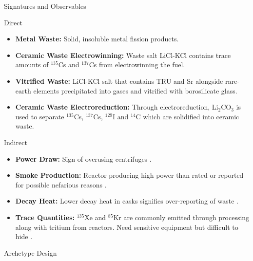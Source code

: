 \documentclass[final]{beamer}
\newlength{\onecolwid}
\newlength{\threecolwid}
\begin{document}
\begin{frame}[t]
\begin{columns}[t,totalwidth=\threecolwid]
\begin{column}{\onecolwid}
\begin{block}{Signatures and Observables}
\begin{block}{Direct}	
	\begin{itemize}
		\item \textbf{Metal Waste:} Solid, insoluble metal fission products.
		\item \textbf{Ceramic Waste Electrowinning:} Waste salt LiCl-KCl contains trace amounts of $^{135}$Cs and $^{137}$Cs from
		electrowinning the fuel.
		\item \textbf{Vitrified Waste:} LiCl-KCl salt that contains TRU and Sr alongside rare-earth elements precipitated into gases
		and vitrified with borosilicate glass.
		\item \textbf{Ceramic Waste Electroreduction:} Through electroreduction, Li$_2$CO$_3$ is used to separate $^{135}$Cs, $^{137}$Cs, 
		$^{129}$I and $^{14}$C which are solidified into ceramic waste.
	\end{itemize}
\end{block}
\begin{block}{Indirect}		
	\begin{itemize}
		\item \textbf{Power Draw:} Sign of overusing centrifuges \cite{Yilmaz_2016,Hou_2016}.
		\item \textbf{Smoke Production:} Reactor producing high power than rated or reported for possible
		nefarious reasons \cite{Yilmaz_2016}.
		\item \textbf{Decay Heat:} Lower decay heat in casks signifies over-reporting of waste \cite{Kemp_2016}.
		\item \textbf{Trace Quantities:} $^{135}$Xe and $^{85}$Kr are commonly emitted through processing along with tritium
		from reactors. Need sensitive equipment but difficult to hide \cite{Borrelli_2017,Kemp_2016}.
	\end{itemize}
\end{block}
\end{block}

    

\begin{block}{Archetype Design}


\end{block}
\end{column}
\end{columns}
\end{frame}
\end{document}
